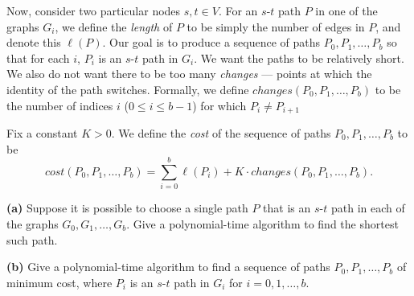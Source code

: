 \documentclass[12pt]{article}
\begin{document}
\begin{enumerate}
Now, consider two particular nodes $s, t \in V$.
For an $s$-$t$ path $P$ in one of the graphs $G_i$,
we define the {\em length} of $P$ to be simply the number
of edges in $P$, and denote this $\ell(P)$.
Our goal is to produce a sequence of paths
$P_0, P_1, \ldots, P_b$ so that
for each $i$, $P_i$ is an $s$-$t$ path in $G_i$.
We want the paths to be relatively short.
We also do not want there to be too many {\em changes} ---
points at which the identity of the path switches.
Formally, we define
$changes(P_0, P_1, \ldots, P_b)$ to be the number of
indices $i$ ($0 \leq i \leq b-1$) for which $P_i \neq P_{i+1}$

Fix a constant $K > 0$.
We define the {\em cost} of the sequence of paths
$P_0, P_1, \ldots, P_b$ to be
$$cost(P_0, P_1, \ldots, P_b) =
\sum_{i=0}^b \ell(P_i) + K \cdot changes(P_0, P_1, \ldots, P_b).$$

{\bf (a)} Suppose it is possible to choose a single path $P$
that is an $s$-$t$ path in each of the graphs $G_0, G_1, \ldots, G_b$.
Give a polynomial-time algorithm to find the shortest such path.

{\bf (b)} Give a polynomial-time algorithm to find a sequence of
paths $P_0, P_1, \ldots, P_b$
of minimum cost, where $P_i$ is an $s$-$t$ path in $G_i$
for $i = 0, 1, \ldots, b$.


\end{enumerate}
\end{document}
